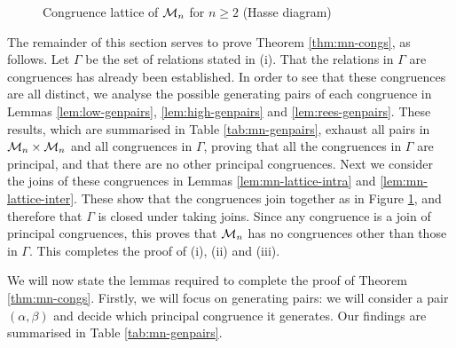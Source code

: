 \begin{figure}[ht]
  \centering
  \caption[Congruence lattice of $\Mot_n$]{Congruence lattice of $\Mot_n$ for
    $n \geq 2$ (Hasse diagram)}
  \label{fig:mn-cong-lattice}
\end{figure}

The remainder of this section serves to prove Theorem \ref{thm:mn-congs}, as
follows.  Let $\Gamma$ be the set of relations stated in (i).  That the
relations in $\Gamma$ are congruences has already been established.  In order to
see that these congruences are all distinct, we analyse the possible generating
pairs of each congruence in Lemmas \ref{lem:low-genpairs},
\ref{lem:high-genpairs} and \ref{lem:rees-genpairs}.  These results, which are
summarised in Table \ref{tab:mn-genpairs}, exhaust all pairs in
$\mathcal{M}_n \times \mathcal{M}_n$ and all congruences in $\Gamma$, proving that all the
congruences in $\Gamma$ are principal, and that there are no other principal
congruences.  Next we consider the joins of these congruences in Lemmas
\ref{lem:mn-lattice-intra} and \ref{lem:mn-lattice-inter}.  These show that the
congruences join together as in Figure \ref{fig:mn-cong-lattice}, and therefore
that $\Gamma$ is closed under taking joins.  Since any congruence is a join of
principal congruences, this proves that $\Mot_n$ has no congruences other than
those in $\Gamma$.  This completes the proof of (i), (ii) and (iii).

We will now state the lemmas required to complete the
proof of Theorem \ref{thm:mn-congs}.  Firstly, we will focus on generating
pairs: we will consider a pair $(\alpha, \beta)$ and decide which principal
congruence it generates.  Our findings are summarised in Table
\ref{tab:mn-genpairs}.

